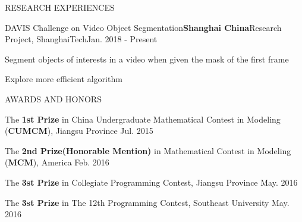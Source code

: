 \documentclass{resume} %
\begin{document}
\begin{rSection}{RESEARCH EXPERIENCES}

\begin{rSubsection}{DAVIS Challenge on Video Object Segmentation}{\bf Shanghai China}{Research Project, ShanghaiTech}{Jan. 2018 - Present} 
\item Segment objects of interests in a video when given the mask of the first frame
\item Explore more efficient algorithm
\end{rSubsection} 

\end{rSection} 

\begin{rSection}{AWARDS AND HONORS} \itemsep -1pt {}   
\item The {\bf 1st Prize} in China Undergraduate Mathematical Contest in Modeling (\textbf{CUMCM}), Jiangsu Province \hfill Jul. 2015
\item The {\bf 2nd Prize(Honorable Mention)} in Mathematical Contest in Modeling (\textbf{MCM}), America \hfill Feb. 2016
\item The {\bf 3st Prize} in Collegiate Programming Contest, Jiangsu Province \hfill May. 2016
\item The {\bf 3st Prize} in The 12th Programming Contest, Southeast University \hfill May. 2016
\end{rSection} 
\end{document}
